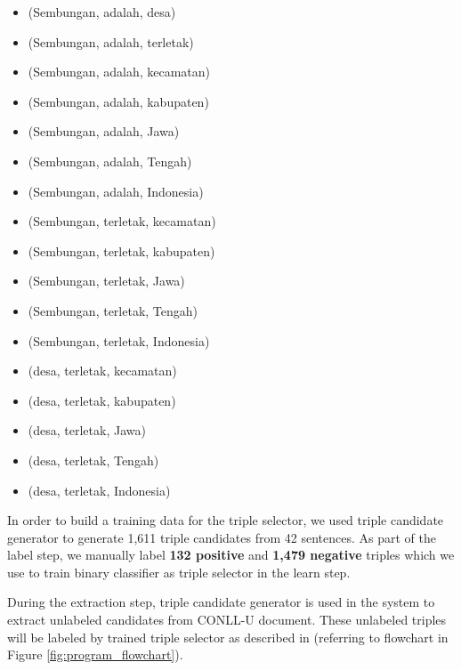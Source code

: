 \begin{itemize}
\item (Sembungan, adalah, desa) 
\item (Sembungan, adalah, terletak)
\item (Sembungan, adalah, kecamatan)
\item (Sembungan, adalah, kabupaten)
\item (Sembungan, adalah, Jawa)
\item (Sembungan, adalah, Tengah)
\item (Sembungan, adalah, Indonesia)
\item (Sembungan, terletak, kecamatan) 
\item (Sembungan, terletak, kabupaten) 
\item (Sembungan, terletak, Jawa) 
\item (Sembungan, terletak, Tengah)
\item (Sembungan, terletak, Indonesia) 
\item (desa, terletak, kecamatan)
\item (desa, terletak, kabupaten)
\item (desa, terletak, Jawa)
\item (desa, terletak, Tengah)
\item (desa, terletak, Indonesia)
\end{itemize}

In order to build a training data for the triple selector, we used triple candidate generator to generate 1,611 triple candidates from 42 sentences. As part of the label step, we manually label \textbf{132 positive} and \textbf{1,479 negative} triples which we use to train binary classifier as triple selector in the learn step.

During the extraction step, triple candidate generator is used in the system to extract unlabeled candidates from CONLL-U document. These unlabeled triples will be labeled by trained triple selector as described in  (referring to flowchart in Figure \ref{fig:program_flowchart}).

